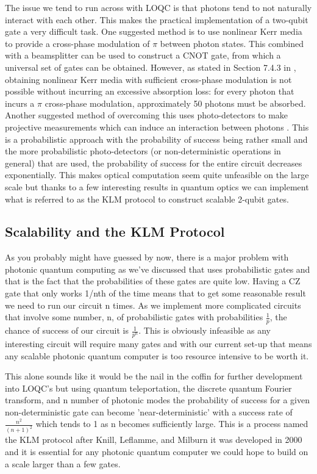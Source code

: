 The issue we tend to run across with LOQC is that photons tend to not naturally interact with each other. This makes the practical implementation of a two-qubit gate a very difficult task. One suggested method is to use nonlinear Kerr media to provide a cross-phase modulation of $\pi$ between photon states. This combined with a beamsplitter can be used to construct a CNOT gate, from which a universal set of gates can be obtained. However, as stated in Section 7.4.3 in \cite{nielsen_chuang_2010}, obtaining nonlinear Kerr media with sufficient cross-phase modulation is not possible without incurring an excessive absorption loss: for every photon that incurs a $\pi$ cross-phase modulation, approximately 50 photons must be absorbed. Another suggested method of overcoming this uses photo-detectors to make projective measurements which can induce an interaction between photons \cite{Kok:2005jip}. This is a probabilistic approach with the probability of success being rather small and the more probabilistic photo-detectors (or non-deterministic operations in general) that are used, the probability of success for the entire circuit decreases exponentially. This makes optical computation seem quite unfeasible on the large scale but thanks to a few interesting results in quantum optics we can implement what is referred to as the KLM protocol to construct scalable 2-qubit gates.

\subsection{Scalability and the KLM Protocol}
As you probably might have guessed by now, there is a major problem with photonic quantum computing as we've discussed that uses probabilistic gates and that is the fact that the probabilities of these gates are quite low. Having a CZ gate that only works 1/nth of the time means that to get some reasonable result we need to run our circuit n times. As we implement more complicated circuits that involve some number, n, of probabilistic gates with probabilities $\frac{1}{p}$, the chance of success of our circuit is $\frac{1}{p^n}$. This is obviously infeasible as any interesting circuit will require many gates and with our current set-up that means any scalable photonic quantum computer is too resource intensive to be worth it. \par
This alone sounds like it would be the nail in the coffin for further development into LOQC's but using quantum teleportation, the discrete quantum Fourier transform, and n number of photonic modes the probability of success for a given non-deterministic gate can become 'near-deterministic' with a success rate of $\frac{n^2}{(n+1)^2}$\cite{Kok:2005jip} which tends to 1 as n becomes sufficiently large. This is a process named the KLM protocol after Knill, Leflamme, and Milburn it was developed in 2000 and it is essential for any photonic quantum computer we could hope to build on a scale larger than a few gates.

